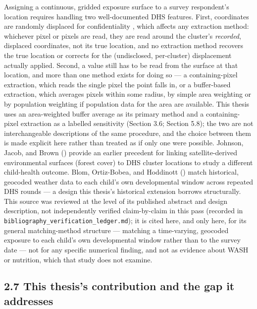 Assigning a continuous, gridded exposure surface to a survey respondent's location requires handling two well-documented DHS features. First, coordinates are randomly displaced for confidentiality \parencite{Burgert2013,PerezHeydrich2013}, which affects any extraction method: whichever pixel or pixels are read, they are read around the cluster's \textit{recorded}, displaced coordinates, not its true location, and no extraction method recovers the true location or corrects for the (undisclosed, per-cluster) displacement actually applied. Second, a value still has to be read from the surface at that location, and more than one method exists for doing so --- a containing-pixel extraction, which reads the single pixel the point falls in, or a buffer-based extraction, which averages pixels within some radius, by simple area weighting or by population weighting if population data for the area are available. This thesis uses an area-weighted buffer average as its primary method and a containing-pixel extraction as a labelled sensitivity (Section 3.6; Section 5.8); the two are not interchangeable descriptions of the same procedure, and the choice between them is made explicit here rather than treated as if only one were possible. Johnson, Jacob, and Brown (\citeyear{JohnsonJacobBrown2013}) provide an earlier precedent for linking satellite-derived environmental surfaces (forest cover) to DHS cluster locations to study a different child-health outcome. Blom, Ortiz-Bobea, and Hoddinott (\citeyear{Blom2022}) match historical, geocoded weather data to each child's own developmental window across repeated DHS rounds --- a design this thesis's historical extension borrows structurally. This source was reviewed at the level of its published abstract and design description, not independently verified claim-by-claim in this pass (recorded in \texttt{bibliography\_verification\_ledger.md}); it is cited here, and only here, for its general matching-method structure --- matching a time-varying, geocoded exposure to each child's own developmental window rather than to the survey date --- not for any specific numerical finding, and not as evidence about WASH or nutrition, which that study does not examine.

\subsection*{2.7 This thesis's contribution and the gap it addresses}

